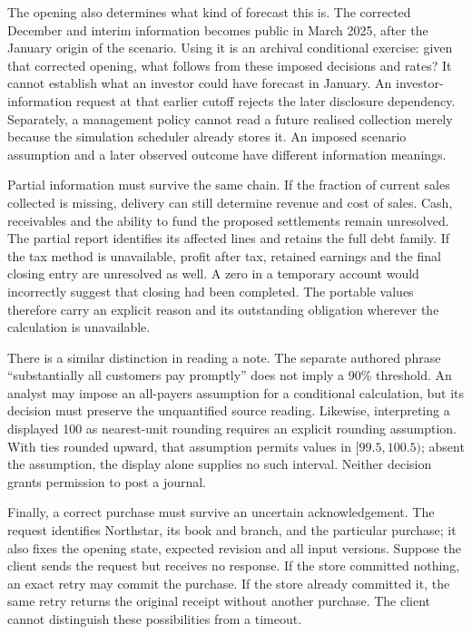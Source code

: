 The opening also determines what kind of forecast this is. The corrected
December and interim information becomes public in March 2025, after the
January origin of the scenario. Using it is an archival conditional exercise:
given that corrected opening, what follows from these imposed decisions and
rates? It cannot establish what an investor could have forecast in January.
An investor-information request at that earlier cutoff rejects the later
disclosure dependency. Separately, a management policy cannot read a future
realised collection merely because the simulation scheduler already stores it.
An imposed scenario assumption and a later observed outcome have different
information meanings.

Partial information must survive the same chain. If the fraction of current
sales collected is missing, delivery can still determine revenue and cost of
sales. Cash, receivables and the ability to fund the proposed settlements remain
unresolved. The partial report identifies its affected lines and retains the
full debt family. If the tax method is unavailable, profit after tax, retained
earnings and the final closing entry are unresolved as well. A zero in a
temporary account would incorrectly suggest that closing had been completed.
The portable values therefore carry an explicit reason and its outstanding
obligation wherever the calculation is unavailable.

There is a similar distinction in reading a note. The separate authored phrase
``substantially all customers pay promptly'' does not imply a 90\% threshold.
An analyst may impose an all-payers assumption for a conditional calculation,
but its decision must preserve the unquantified source reading. Likewise,
interpreting a displayed 100 as nearest-unit rounding requires an explicit
rounding assumption. With ties rounded upward, that assumption permits values
in $[99.5,100.5)$; absent the assumption, the display alone supplies no such
interval. Neither decision grants permission to post a journal.

Finally, a correct purchase must survive an uncertain acknowledgement. The
request identifies Northstar, its book and branch, and the particular purchase;
it also fixes the opening state, expected revision and all input versions.
Suppose the client sends the request but receives no response. If the store
committed nothing, an exact retry may commit the purchase. If the store already
committed it, the same retry returns the original receipt without another
purchase. The client cannot distinguish these possibilities from a timeout.

